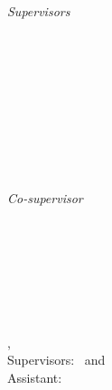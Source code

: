 \begin{titlepage}
	\vfill
	\begin{minipage}[t]{.27\textwidth}
		\raggedleft
		\textit{Supervisors}
	\end{minipage}
	\hspace*{15pt}
	\begin{minipage}[t]{.65\textwidth}
		{\Large \Supervisor} \\
	  	{\small \SupervisorDepartment} \\[-1mm]
		{\small \SupervisorUniversity}
	\end{minipage} \\[5mm]
	\begin{minipage}[t]{.27\textwidth}
		\raggedleft
		\textit{ }
	\end{minipage}
	\hspace*{15pt}
	\begin{minipage}[t]{.65\textwidth}
		{\Large \coSupervisor} \\
	  	{\small \coSupervisorDepartment} \\[-1mm]
		{\small \coSupervisorUniversity}
	\end{minipage} \\[10mm]
	\begin{minipage}[t]{.27\textwidth}
		\raggedleft
		\textit{Co-supervisor}
	\end{minipage}
	\hspace*{15pt}
	\begin{minipage}[t]{.65\textwidth}
		\Assistant\ %
	\end{minipage} \\[10mm]

	\thesisDate \\

\end{titlepage}


\hfill
\vfill
{
	\small
	\textbf{\thesisName} \\
	\textit{\thesisTitle} \\
	\thesisSubject, \thesisDate \\
	Supervisors: \Supervisor\ and \coSupervisor \\
	Assistant: \Assistant\ \\[1.5em]
	\textbf{\thesisUniversity} \\
	\thesisUniversityInstitute \\
	\thesisUniversityDepartment \\
	\thesisUniversityStreetAddress \\
	\thesisUniversityPostalCode\ \thesisUniversityCity
}
